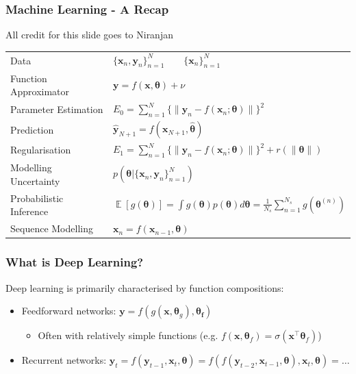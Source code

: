 \documentclass[]{article}
\begin{document}
\begin{frame}
\frametitle{Machine Learning - A Recap}
{\tiny All credit for this slide goes to Niranjan}\par
\vspace{5mm}
\begin{tabular}{ll}
Data & $\{\bm{x}_n, \bm{y}_n\}^N_{n=1} \qquad \{\bm{x}_n\}^N_{n=1}$
\vspace{3mm} \\ \pause
Function Approximator & $\bm{y} = f (\bm{x}, \bm{\theta}) + \nu$
\vspace{3mm} \\ \pause
Parameter Estimation & $E_0 = \sum^N_{n=1} \{\|\bm{y}_n - f (\bm{x}_n; \bm{\theta})\|\}^2$
\vspace{3mm} \\ \pause
Prediction & $\bm{\hat y}_{N+1} = f(\bm{x}_{N+1}, \bm{\hat \theta})$
\vspace{3mm} \\ \pause
Regularisation & $E_1 = \sum^N_{n=1} \{\|\bm{y}_n - f (\bm{x}_n; \bm{\theta})\|\}^2 + r(\|\bm\theta\|)$
\vspace{3mm} \\ \pause
Modelling Uncertainty & $p(\bm\theta|\{\bm x_n, \bm y_n\}_{n=1}^N)$
\vspace{3mm} \\ \pause
Probabilistic Inference & $\mathop{\mathbb{E}}[g(\bm\theta)] = \int g(\bm\theta)p(\bm\theta)d\bm\theta = \frac{1}{N_s}\sum_{n=1}^{N_s}g(\bm\theta^{(n)})$
\vspace{3mm} \\ \pause
Sequence Modelling & $\bm x_n = f(\bm x_{n-1}, \bm\theta)$
\end{tabular}
\vspace{5mm}
\end{frame}

\begin{frame}
\frametitle{What is Deep Learning?}

Deep learning is primarily characterised by function compositions: \\ \vspace{10mm}
\begin{itemize}
	\item<2-> Feedforward networks: $\bm{y} = f (g(\bm{x}, \bm\theta_g), \bm{\theta_f})$
	\begin{itemize}
		\item Often with relatively simple functions (e.g. $f(\bm x, \bm{\theta}_f) = \sigma(\bm{x}^\top \bm{\theta}_f)$)
	\end{itemize} \vspace{3mm}
	\item<3-> Recurrent networks: $\bm y_t = f(\bm y_{t-1}, \bm x_t, \bm\theta) = f(f(\bm y_{t-2}, \bm x_{t-1}, \bm\theta), \bm x_t, \bm\theta) = \dots$
\end{itemize}
\vspace{10mm}


\end{frame}
\end{document}

